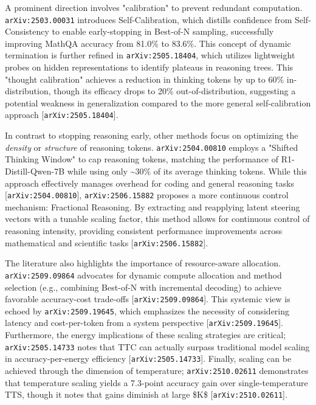 \documentclass[11pt]{article}
\begin{document}
A prominent direction involves "calibration" to prevent redundant computation. \texttt{arXiv:2503.00031} introduces Self-Calibration, which distills confidence from Self-Consistency to enable early-stopping in Best-of-N sampling, successfully improving MathQA accuracy from 81.0\% to 83.6\%. This concept of dynamic termination is further refined in \texttt{arXiv:2505.18404}, which utilizes lightweight probes on hidden representations to identify plateaus in reasoning trees. This "thought calibration" achieves a reduction in thinking tokens by up to 60\% in-distribution, though its efficacy drops to 20\% out-of-distribution, suggesting a potential weakness in generalization compared to the more general self-calibration approach [\texttt{arXiv:2505.18404}].

In contrast to stopping reasoning early, other methods focus on optimizing the \textit{density} or \textit{structure} of reasoning tokens. \texttt{arXiv:2504.00810} employs a "Shifted Thinking Window" to cap reasoning tokens, matching the performance of R1-Distill-Qwen-7B while using only \textasciitilde{}30\% of its average thinking tokens. While this approach effectively manages overhead for coding and general reasoning tasks [\texttt{arXiv:2504.00810}], \texttt{arXiv:2506.15882} proposes a more continuous control mechanism: Fractional Reasoning. By extracting and reapplying latent steering vectors with a tunable scaling factor, this method allows for continuous control of reasoning intensity, providing consistent performance improvements across mathematical and scientific tasks [\texttt{arXiv:2506.15882}].

The literature also highlights the importance of resource-aware allocation. \texttt{arXiv:2509.09864} advocates for dynamic compute allocation and method selection (e.g., combining Best-of-N with incremental decoding) to achieve favorable accuracy-cost trade-offs [\texttt{arXiv:2509.09864}]. This systemic view is echoed by \texttt{arXiv:2509.19645}, which emphasizes the necessity of considering latency and cost-per-token from a system perspective [\texttt{arXiv:2509.19645}]. Furthermore, the energy implications of these scaling strategies are critical; \texttt{arXiv:2505.14733} notes that TTC can actually surpass traditional model scaling in accuracy-per-energy efficiency [\texttt{arXiv:2505.14733}]. Finally, scaling can be achieved through the dimension of temperature; \texttt{arXiv:2510.02611} demonstrates that temperature scaling yields a 7.3-point accuracy gain over single-temperature TTS, though it notes that gains diminish at large \$K\$ [\texttt{arXiv:2510.02611}].
\end{document}
